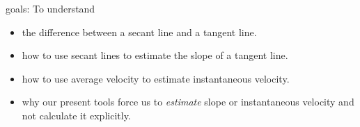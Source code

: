 \documentclass[11pt,fleqn]{article}
\begin{document}
\renewcommand{\headrulewidth}{0pt}
\newcommand{\blank}[1]{\rule{#1}{0.75pt}}
\renewcommand{\d}{\displaystyle}
\vspace*{-0.7in}
\begin{center}
  \large {}
\end{center}
goals: To understand
\begin{itemize}
\item the difference between a secant line and a tangent line.
\item how to use secant lines to estimate the slope of a tangent line.
\item how to use average velocity to estimate instantaneous velocity.
\item why our present tools force us to \emph{estimate} slope or instantaneous velocity and not calculate it explicitly.
\end{itemize}
\end{document}
